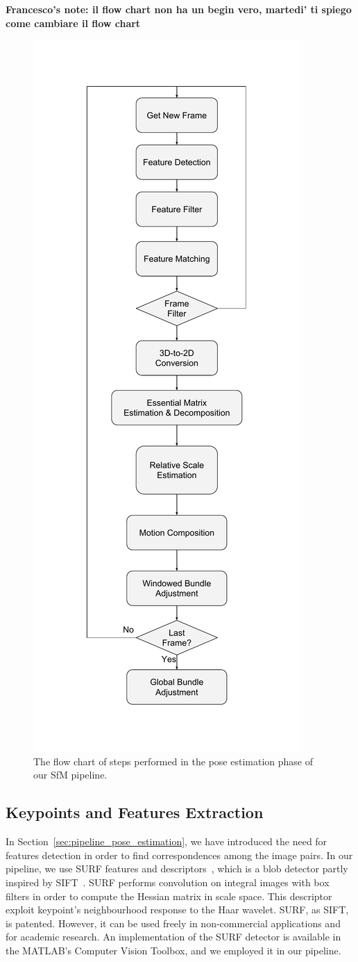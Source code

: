 \textbf{Francesco's note: il flow chart non ha un begin vero, martedi' ti spiego come cambiare il flow chart}
\begin{figure}
	\centering
	\includegraphics[width=0.5\linewidth]{img/sfm_block.pdf}
	\caption{The flow chart of steps performed in the pose estimation 
	phase of our SfM pipeline.}
	\label{fig:sfm_block}
\end{figure}

\subsection{Keypoints and Features Extraction}
In Section~\ref{sec:pipeline_pose_estimation}, we have introduced the need for 
features detection in order to find correspondences among the image pairs.
In our pipeline, we use SURF features and descriptors~\cite{bay2006surf},
which is a blob detector partly inspired by SIFT~\cite{lowe1999object}.
SURF performs convolution on integral images with box filters in order to 
compute the Hessian matrix in scale space.
This descriptor exploit keypoint's neighbourhood response to the Haar wavelet.
SURF, as SIFT, is patented. However, it can be used freely in non-commercial
applications and for academic research.
An implementation of the SURF detector is available in the MATLAB's Computer 
Vision Toolbox, and we employed it in our pipeline.

